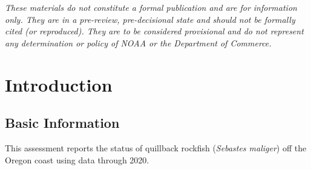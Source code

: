 \documentclass[11pt,
  english,
  a4paper,
]{article}
\begin{document}
\newcommand{\lt}{\ensuremath <}
\newcommand{\gt}{\ensuremath >}


\vspace{20cm}


\emph{These materials do not constitute a formal publication and are for information only. They are in a pre-review, pre-decisional state and should not be formally cited (or reproduced). They are to be considered provisional and do not represent any determination or policy of NOAA or the Department of Commerce.}

\leavevmode\tagmcend\tagstructend\par

\pagebreak
{}
\setcounter{page}{1}

\renewcommand{\thetable}{\roman{table}}
\renewcommand{\thefigure}{\roman{figure}}

\setlength\parskip{0.5em plus 0.1em minus 0.2em}

\pagebreak
\setlength{\parskip}{5mm plus1mm minus1mm}
\setcounter{page}{1}
\renewcommand{\thetable}{\arabic{table}}
\renewcommand{\thefigure}{\arabic{figure}}
\setcounter{table}{0}
\setcounter{figure}{0}

\setlength\parskip{0.5em plus 0.1em minus 0.2em}


\hypertarget{introduction}{%
\section{Introduction}\label{introduction}}

\leavevmode\tagmcend\tagstructend


\hypertarget{basic-information}{%
\subsection{Basic Information}\label{basic-information}}

\leavevmode\tagmcend\tagstructend


This assessment reports the status of quillback rockfish (\emph{Sebastes maliger}) off the Oregon coast using data through 2020.
\end{document}
